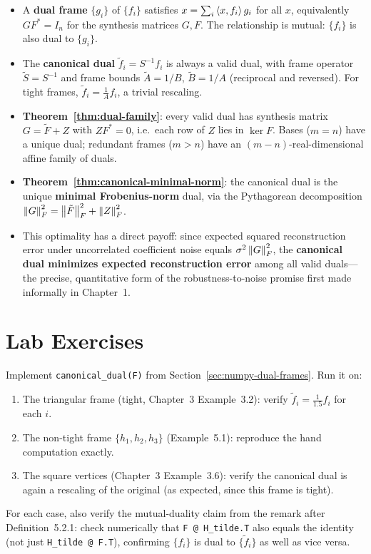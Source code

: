 \begin{itemize}
  \item A \textbf{dual frame} $\{g_i\}$ of $\{f_i\}$ satisfies
        $x=\sum_i\left\langle x, f_i \right\rangle g_i$ for all $x$, equivalently
        $GF^*=I_n$ for the synthesis matrices $G, F$. The relationship
        is mutual: $\{f_i\}$ is also dual to $\{g_i\}$.
  \item The \textbf{canonical dual} $\tilde f_i=S^{-1}f_i$ is always a
        valid dual, with frame operator $\tilde S=S^{-1}$ and frame
        bounds $\tilde A=1/B$, $\tilde B=1/A$ (reciprocal and reversed).
        For tight frames, $\tilde f_i=\tfrac1Af_i$, a trivial rescaling.
  \item \textbf{Theorem~\ref{thm:dual-family}}: every valid dual has
        synthesis matrix $G=\tilde F+Z$ with $ZF^*=0$, i.e.\ each row
        of $Z$ lies in $\ker F$. Bases ($m=n$) have a unique dual;
        redundant frames ($m>n$) have an $(m-n)$-real-dimensional
        affine family of duals.
  \item \textbf{Theorem~\ref{thm:canonical-minimal-norm}}: the canonical
        dual is the unique \textbf{minimal Frobenius-norm} dual, via the
        Pythagorean decomposition $\left\| G \right\|_F^2=\left\| \tilde F \right\|_F^2+\left\| Z \right\|_F^2$.
  \item This optimality has a direct payoff: since expected squared
        reconstruction error under uncorrelated coefficient noise equals
        $\sigma^2\left\| G \right\|_F^2$, the \textbf{canonical dual minimizes
        expected reconstruction error} among all valid duals---the
        precise, quantitative form of the robustness-to-noise promise
        first made informally in Chapter~1.
\end{itemize}

\section{Lab Exercises}
\label{sec:lab-ch5}

\begin{exercisebox}[title={Lab Exercise 5.1: The Canonical Dual Pipeline}]
\label{lab:dual-symmetry}
Implement \texttt{canonical\_dual(F)} from
Section~\ref{sec:numpy-dual-frames}. Run it on:
\begin{enumerate}[label=(\alph*)]
  \item The triangular frame (tight, Chapter~3 Example~3.2): verify
        $\tilde f_i = \tfrac{1}{1.5}f_i$ for each $i$.
  \item The non-tight frame $\{h_1,h_2,h_3\}$ (Example~5.1): reproduce
        the hand computation exactly.
  \item The square vertices (Chapter~3 Example~3.6): verify the
        canonical dual is again a rescaling of the original (as
        expected, since this frame is tight).
\end{enumerate}
For each case, also verify the mutual-duality claim from the remark
after Definition~5.2.1: check numerically that
\texttt{F @ H\_tilde.T} also equals the identity (not just
\texttt{H\_tilde @ F.T}), confirming $\{f_i\}$ is dual to
$\{\tilde f_i\}$ as well as vice versa.
\end{exercisebox}

